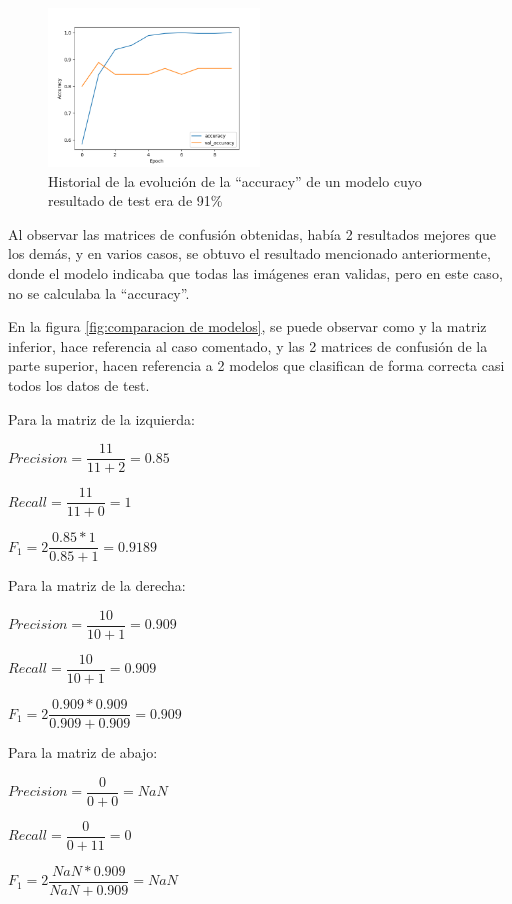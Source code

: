         \begin{figure}[!ht]
                 \centering
                 \includegraphics[width=0.5\textwidth]{img/modelo2-0.009int2_0.913043498992919920230525-172156.png}
                  \caption{Historial de la evolución de la ``accuracy''  de un modelo cuyo resultado de test era de 91\% }
                 \label{fig:accuracy}
        \end{figure}


Al observar las matrices de confusión obtenidas, había 2 resultados mejores que los demás, y en varios casos, se obtuvo el resultado mencionado anteriormente, donde el modelo indicaba que todas las imágenes eran validas, pero en este caso, no se calculaba la ``accuracy''.

En la figura \ref{fig:comparacion de modelos}, se puede observar como y la matriz inferior, hace referencia al caso comentado, y las 2 matrices de confusión de la parte superior, hacen referencia a 2 modelos que clasifican de forma correcta casi todos los datos de test.

Para la matriz de la izquierda:
\begin{center}
    $Precision = \dfrac{11} {11 + 2} = 0.85 $

    $Recall = \dfrac{11} {11 + 0} = 1 $

    $F_1 = 2 \dfrac{0.85 * 1} {0.85 + 1} = 0.9189 $
\end{center}


Para la matriz de la derecha:
\begin{center}
    $Precision = \dfrac{10} {10 + 1} = 0.909 $

    $Recall = \dfrac{10} {10 + 1} = 0.909 $

    $F_1 = 2 \dfrac{0.909 * 0.909} {0.909 + 0.909} = 0.909 $    
\end{center}

Para la matriz de abajo:

\begin{center}
    $Precision = \dfrac{0} {0 + 0} = NaN $

    $Recall = \dfrac{0} {0 + 11} = 0 $

    $F_1 = 2 \dfrac{NaN * 0.909} {NaN + 0.909} = NaN $    
\end{center}

